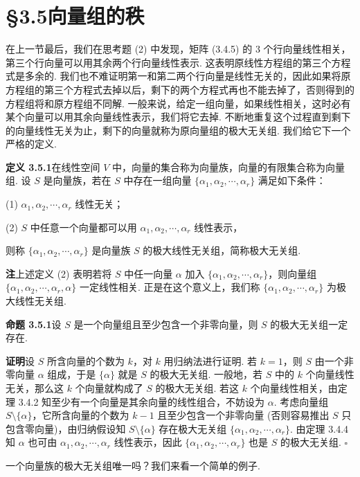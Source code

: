 \documentclass[UTF8, 12pt, fontset=fandol, oneside]{ctexart}
\begin{document}
\section*{§3.5\quad 向量组的秩}

在上一节最后，我们在思考题 (2) 中发现，矩阵 (3.4.5) 的 3 个行向量线性相关，第三个行向量可以用其余两个行向量线性表示. 这表明原线性方程组的第三个方程式是多余的. 我们也不难证明第一和第二两个行向量是线性无关的，因此如果将原方程组的第三个方程式去掉以后，剩下的两个方程式再也不能去掉了，否则得到的方程组将和原方程组不同解. 一般来说，给定一组向量，如果线性相关，这时必有某个向量可以用其余向量线性表示，我们将它去掉. 不断地重复这个过程直到剩下的向量线性无关为止，剩下的向量就称为原向量组的极大无关组. 我们给它下一个严格的定义.

\noindent\textbf{定义 3.5.1}\quad 在线性空间 $V$ 中，向量的集合称为向量族，向量的有限集合称为向量组. 设 $S$ 是向量族，若在 $S$ 中存在一组向量 $\{\alpha_1,\alpha_2,\cdots,\alpha_r\}$ 满足如下条件：

(1) $\alpha_1,\alpha_2,\cdots,\alpha_r$ 线性无关；

(2) $S$ 中任意一个向量都可以用 $\alpha_1,\alpha_2,\cdots,\alpha_r$ 线性表示，

则称 $\{\alpha_1,\alpha_2,\cdots,\alpha_r\}$ 是向量族 $S$ 的极大线性无关组，简称极大无关组.

\noindent\textbf{注}\quad 上述定义 (2) 表明若将 $S$ 中任一向量 $\alpha$ 加入 $\{\alpha_1,\alpha_2,\cdots,\alpha_r\}$，则向量组 $\{\alpha_1,\alpha_2,\cdots,\alpha_r,\alpha\}$ 一定线性相关. 正是在这个意义上，我们称 $\{\alpha_1,\alpha_2,\cdots,\alpha_r\}$ 为极大线性无关组.

\noindent\textbf{命题 3.5.1}\quad 设 $S$ 是一个向量组且至少包含一个非零向量，则 $S$ 的极大无关组一定存在.

\noindent\textbf{证明}\quad 设 $S$ 所含向量的个数为 $k$，对 $k$ 用归纳法进行证明. 若 $k=1$，则 $S$ 由一个非零向量 $\alpha$ 组成，于是 $\{\alpha\}$ 就是 $S$ 的极大无关组. 一般地，若 $S$ 中的 $k$ 个向量线性无关，那么这 $k$ 个向量就构成了 $S$ 的极大无关组. 若这 $k$ 个向量线性相关，由定理 3.4.2 知至少有一个向量是其余向量的线性组合，不妨设为 $\alpha$. 考虑向量组 $S\setminus\{\alpha\}$，它所含向量的个数为 $k-1$ 且至少包含一个非零向量 (否则容易推出 $S$ 只包含零向量)，由归纳假设知 $S\setminus\{\alpha\}$ 存在极大无关组 $\{\alpha_1,\alpha_2,\cdots,\alpha_r\}$. 由定理 3.4.4 知 $\alpha$ 也可由 $\alpha_1,\alpha_2,\cdots,\alpha_r$ 线性表示，因此 $\{\alpha_1,\alpha_2,\cdots,\alpha_r\}$ 也是 $S$ 的极大无关组. $\square$

一个向量族的极大无关组唯一吗？我们来看一个简单的例子.
\end{document}
